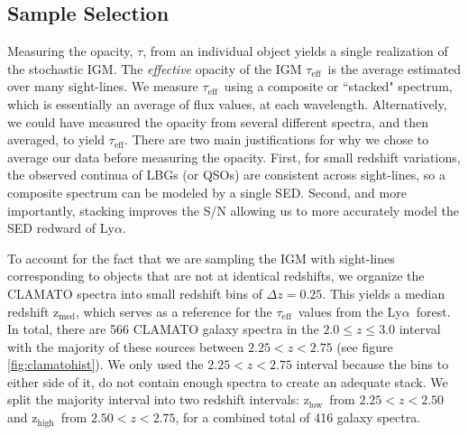 \documentclass[twocolumn,tight,times]{aastex63}
\newcommand{\mteff}{\tau_\mathrm{eff}}
\newcommand{\teff}{$\mteff$}
\newcommand{\lya}{Ly$\alpha$}
\newcommand{\zem}{$\mathrm{z_{med}}$}
\newcommand{\hiz}{$\mathrm{z_{high}}$}
\newcommand{\loz}{$\mathrm{z_{low}}$}
\begin{document}
\subsection{Sample Selection}
\label{subsec:sample}

Measuring the opacity, $\tau$, from an individual object yields a single realization of the stochastic IGM. The \textit{effective} opacity of the IGM \teff\ is the average estimated over many sight-lines. We measure \teff\ using a composite or ``stacked" spectrum, which is essentially an average of flux values, at each wavelength. Alternatively, we could have measured the opacity from several different spectra, and then averaged, to yield \teff. There are two main justifications for why we chose to average our data before measuring the opacity. First, for small redshift variations, the observed continua of LBGs (or QSOs) are consistent across sight-lines, so a composite spectrum can be modeled by a single SED. Second, and more importantly, stacking improves the S/N allowing us to more accurately model the SED redward of \lya.

To account for the fact that we are sampling the IGM with sight-lines corresponding to objects that are not at identical redshifts, we organize the CLAMATO spectra into small redshift bins of $\Delta z = 0.25$. This yields a median redshift \zem, which serves as a reference for the \teff\ values from the \lya\ forest. In total, there are 566 CLAMATO galaxy spectra in the $2.0 \leq z \leq 3.0$ interval with the majority of these sources between $2.25 < z < 2.75$ (see figure \ref{fig:clamatohist}). We only used the $2.25 < z < 2.75$ interval because the bins to either side of it, do not contain enough spectra to create an adequate stack. We split the majority interval into two redshift intervals: \loz\ from $2.25 < z < 2.50$ and \hiz\ from $2.50 < z < 2.75$, for a combined total of 416 galaxy spectra.
\end{document}
